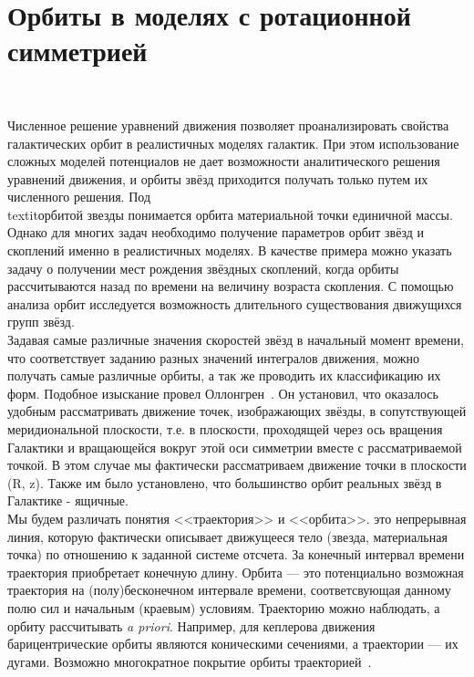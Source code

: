 \section{Орбиты в моделях с ротационной симметрией}
~\par
Численное решение уравнений движения позволяет проанализировать свойства галактических орбит в реалистичных моделях галактик. При этом использование сложных моделей потенциалов не дает возможности аналитического решения уравнений движения, и орбиты звёзд приходится получать только путем их численного решения. Под \\textit{орбитой звезды} понимается орбита материальной точки единичной массы. Однако для многих задач необходимо получение параметров орбит звёзд и скоплений именно в реалистичных моделях. В качестве примера можно указать задачу о получении мест рождения звёздных скоплений, когда орбиты рассчитываются назад по времени на величину возраста скопления. С помощью анализа орбит исследуется возможность длительного существования движущихся групп звёзд.\\

Задавая самые различные значения скоростей звёзд в начальный момент времени, что соответствует заданию разных значений интегралов движения, можно получать самые различные орбиты, а так же проводить их классификацию их форм. Подобное изыскание провел Оллонгрен~\cite{OLLONGREN}. Он установил, что оказалось удобным рассматривать движение точек, изображающих звёзды, в сопутствующей меридиональной плоскости, т.е. в плоскости, проходящей через ось вращения Галактики и вращающейся вокруг этой оси симметрии вместе с рассматриваемой точкой. В этом случае мы фактически рассматриваем движение точки в плоскости (R, z). Также им было установлено, что большинство орбит реальных звёзд в Галактике - ящичные.\\

Мы будем различать понятия <<траектория>> и <<орбита>>.  это непрерывная линия, которую фактически описывает движущееся тело (звезда, материальная точка) по отношению к заданной системе отсчета. За конечный интервал времени траектория приобретает конечную длину. Орбита --- это потенциально возможная траектория на (полу)бесконечном интервале времени, соответсвующая данному полю сил и начальным (краевым) условиям. Траекторию можно наблюдать, а орбиту рассчитывать \emph{a priori}. Например, для кеплерова движения барицентрические орбиты являются коническими сечениями, а траектории --- их дугами. Возможно многократное покрытие орбиты траекторией~\cite{KutuzovOssipkov}.\\

